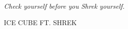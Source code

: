\clearpage

\thispagestyle{empty}
\null\vfill

\newlength\longest
\settowidth{}
\parbox{\longest}{%
  \centering
  \raggedright{\huge\itshape%
  \calligra Check yourself before you Shrek yourself.\par\bigskip
  }
  \raggedleft\large\MakeUppercase{Ice Cube ft. Shrek}\par%
}

\vfill\vfill

\clearpage
